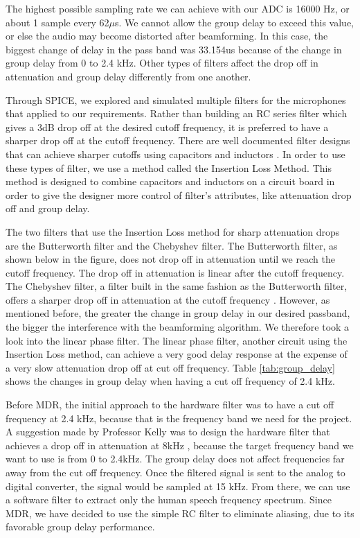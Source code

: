 \documentclass[10pt,journal,compsoc]{IEEEtran}
\begin{document}
The highest possible sampling rate we can achieve with our ADC is 16000 Hz, or about 1 sample every 62$\mu$s. We cannot allow the group delay to exceed this value, or else the audio may become distorted after beamforming. In this case, the biggest change of delay in the pass band was 33.154us because of the change in group delay from 0 to 2.4 kHz. Other types of filters affect the drop off in attenuation and group delay differently from one another.

Through SPICE, we explored and simulated multiple filters for the microphones that applied to our requirements. Rather than building an RC series filter which gives a 3dB drop off at the desired cutoff frequency, it is preferred to have a sharper drop off at the cutoff frequency. There are well documented filter designs that can achieve sharper cutoffs using capacitors and inductors \cite{pozar}. In order to use these types of filter, we use a method called the Insertion Loss Method. This method is designed to combine capacitors and inductors on a circuit board in order to give the designer more control of filter’s attributes, like attenuation drop off and group delay.

The two filters that use the Insertion Loss method for sharp attenuation drops are the Butterworth filter and the Chebyshev filter. The Butterworth filter, as shown below in the figure, does not drop off in attenuation until we reach the cutoff frequency. The drop off in attenuation is linear after the cutoff frequency. The Chebyshev filter, a filter built in the same fashion as the Butterworth filter, offers a sharper drop off in attenuation at the cutoff frequency \cite{pozar}. However, as mentioned before, the greater the change in group delay in our desired passband, the bigger the interference with the beamforming algorithm. We therefore took a look into the linear phase filter. The linear phase filter, another circuit using the Insertion Loss method, can achieve a very good delay response at the expense of a very slow attenuation drop off at cut off frequency. Table \ref{tab:group_delay} shows the changes in group delay when having a cut off frequency of 2.4 kHz.

 Before MDR, the initial approach to the hardware filter was to have a cut off frequency at 2.4 kHz, because that is the frequency band we need for the project. A suggestion made by Professor Kelly was to design the hardware filter that achieves a drop off in attenuation at 8kHz , because the target frequency band we want to use is from 0 to 2.4kHz. The group delay does not affect frequencies far away from the cut off frequency. Once the filtered signal is sent to the analog to digital converter, the signal would be sampled at 15 kHz. From there, we can use a software filter to extract only the human speech frequency spectrum. Since MDR, we have decided to use the simple RC filter to eliminate aliasing, due to its favorable group delay performance.
\end{document}

